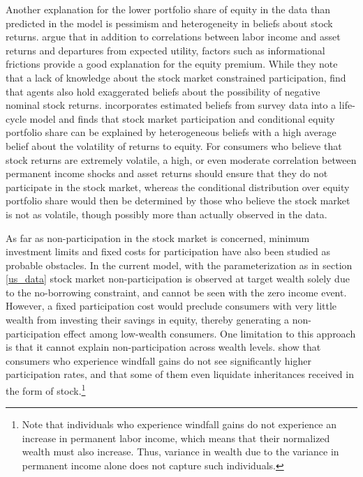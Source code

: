 Another explanation for the lower portfolio share of equity in the data than predicted in the model is pessimism and heterogeneity in beliefs about stock returns. \citet{Haliassos1995} argue that in addition to correlations between labor income and asset returns and departures from expected utility, factors such as informational frictions provide a good explanation for the equity premium. While they note that a lack of knowledge about the stock market constrained participation, \citet{Dominitz2007} find that agents also hold exaggerated beliefs about the possibility of negative nominal stock returns. \citet{Mateo2024} incorporates estimated beliefs from survey data into a life-cycle model and finds that stock market participation and conditional equity portfolio share can be explained by heterogeneous beliefs with a high average belief about the volatility of returns to equity. For consumers who believe that stock returns are extremely volatile, a high, or even moderate correlation between permanent income shocks and asset returns should ensure that they do not participate in the stock market, whereas the conditional distribution over equity portfolio share would then be determined by those who believe the stock market is not as volatile, though possibly more than actually observed in the data.

As far as non-participation in the stock market is concerned, minimum investment limits and fixed costs for participation have also been studied as probable obstacles. In the current model, with the parameterization as in section \ref{us_data} stock market non-participation is observed at target wealth solely due to the no-borrowing constraint, and cannot be seen with the zero income event. However, a fixed participation cost would preclude consumers with very little wealth from investing their savings in equity, thereby generating a non-participation effect among low-wealth consumers. One limitation to this approach is that it cannot explain non-participation across wealth levels. \citet{Andersen2011,Briggs2021} show that consumers who experience windfall gains do not see significantly higher participation rates, and that some of them even liquidate inheritances received in the form of stock.\footnote{Note that individuals who experience windfall gains do not experience an increase in permanent labor income, which means that their normalized wealth must also increase. Thus, variance in wealth due to the variance in permanent income alone does not capture such individuals.}